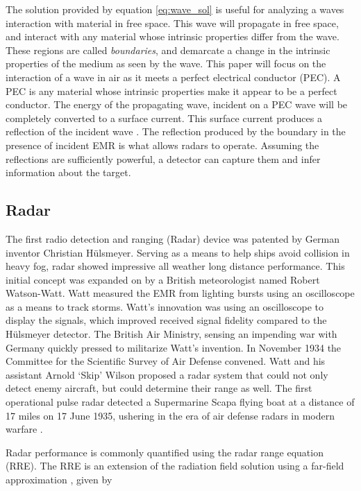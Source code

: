		The solution provided by equation \ref{eq:wave_sol} is useful for analyzing a waves interaction with material in free space. This wave will propagate in free space, and interact with any material whose intrinsic properties differ from the wave. These regions are called \textit{boundaries}, and demarcate a change in the intrinsic properties of the medium as seen by the wave. This paper will focus on the interaction of a wave in air as it meets a perfect electrical conductor (PEC). A PEC is any material whose intrinsic properties make it appear to be a perfect conductor. The energy of the propagating wave, incident on a PEC wave will be completely converted to a surface current. This surface current produces a reflection of the incident wave \cite{KONG}. The reflection produced by the boundary in the presence of incident EMR is what allows radars to operate. Assuming the reflections are sufficiently powerful, a detector can capture them and infer information about the target.

	\subsection{Radar}
		\label{sec:RD}
	 	The first radio detection and ranging (Radar) device was patented by German inventor Christian H{\"u}lsmeyer. Serving as a means to help ships avoid collision in heavy fog, radar showed impressive all weather long distance performance. This initial concept was expanded on by a British meteorologist named Robert Watson-Watt. Watt measured the EMR from lighting bursts using an oscilloscope as a means to track storms. Watt's innovation was using an oscilloscope to display the signals, which improved received signal fidelity compared to the H{\"u}lsmeyer detector. The British Air Ministry, sensing an impending war with Germany quickly pressed to militarize Watt's invention. In November 1934 the Committee for the Scientific Survey of Air Defense convened. Watt and his assistant Arnold `Skip' Wilson proposed a radar system that could not only detect enemy aircraft, but could determine their range as well. The first operational pulse radar detected a Supermarine Scapa flying boat at a distance of 17 miles on 17 June 1935, ushering in the era of air defense radars in modern warfare \cite{Bowen}.

		Radar performance is commonly quantified using the radar range equation (RRE). The RRE is an extension of the radiation field solution using a far-field approximation \cite{KONG}, given by

